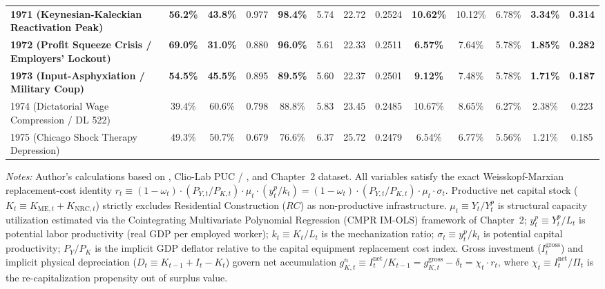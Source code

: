 \begin{table}[htbp]
{\begin{tabular}{lcccccccccccc}
\textbf{1971 (Keynesian-Kaleckian Reactivation Peak)} & \textbf{56.2\%} & \textbf{43.8\%} & 0.977 & \textbf{98.4\%} & 5.74 & 22.72 & 0.2524 & \textbf{10.62\%} & 10.12\% & 6.78\% & \textbf{3.34\%} & \textbf{0.314} \\
\textbf{1972 (Profit Squeeze Crisis / Employers' Lockout)} & \textbf{69.0\%} & \textbf{31.0\%} & 0.880 & \textbf{96.0\%} & 5.61 & 22.33 & 0.2511 & \textbf{6.57\%} & 7.64\% & 5.78\% & \textbf{1.85\%} & \textbf{0.282} \\
\textbf{1973 (Input-Asphyxiation / Military Coup)} & \textbf{54.5\%} & \textbf{45.5\%} & 0.895 & \textbf{89.5\%} & 5.60 & 22.37 & 0.2501 & \textbf{9.12\%} & 7.48\% & 5.78\% & \textbf{1.71\%} & \textbf{0.187} \\
1974 (Dictatorial Wage Compression / DL 522) & 39.4\% & 60.6\% & 0.798 & 88.8\% & 5.83 & 23.45 & 0.2485 & 10.67\% & 8.65\% & 6.27\% & 2.38\% & 0.223 \\
1975 (Chicago Shock Therapy Depression) & 49.3\% & 50.7\% & 0.679 & 76.6\% & 6.37 & 25.72 & 0.2479 & 6.54\% & 6.77\% & 5.56\% & 1.21\% & 0.185 \\
\bottomrule
\end{tabular}%
}
\begin{minipage}{0.98\textwidth}
\vspace{0.4em}
\footnotesize
\textit{Notes:} Author's calculations based on \citet{Astorga2023}, Clio-Lab PUC / \citet{DiazLudersWagner2016}, and Chapter~2 dataset. All variables satisfy the exact Weisskopf-Marxian replacement-cost identity $r_t \equiv (1 - \omega_t) \cdot (P_{Y, t} / P_{K, t}) \cdot \mu_t \cdot (y^p_t / k_t) = (1 - \omega_t) \cdot (P_{Y, t} / P_{K, t}) \cdot \mu_t \cdot \sigma_t$. Productive net capital stock ($K_t \equiv K_{\text{ME}, t} + K_{\text{NRC}, t}$) strictly excludes Residential Construction ($RC$) as non-productive infrastructure. $\mu_t \equiv Y_t / Y^p_t$ is structural capacity utilization estimated via the Cointegrating Multivariate Polynomial Regression (CMPR IM-OLS) framework of Chapter~2; $y^p_t \equiv Y^p_t / L_t$ is potential labor productivity (real GDP per employed worker); $k_t \equiv K_t / L_t$ is the mechanization ratio; $\sigma_t \equiv y^p_t / k_t$ is potential capital productivity; $P_Y / P_K$ is the implicit GDP deflator relative to the capital equipment replacement cost index. Gross investment ($I^{\text{gross}}_t$) and implicit physical depreciation ($D_t \equiv K_{t-1} + I_t - K_t$) govern net accumulation $g^n_{K, t} \equiv I^{\text{net}}_t / K_{t-1} = g^{\text{gross}}_{K, t} - \delta_t = \chi_t \cdot r_t$, where $\chi_t \equiv I^{\text{net}}_t / \Pi_t$ is the re-capitalization propensity out of surplus value.
\end{minipage}
\end{table}
